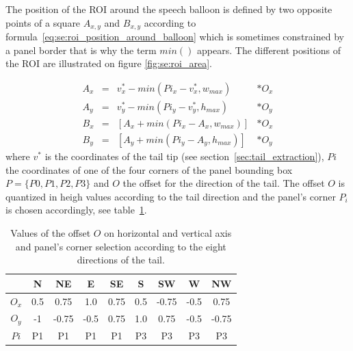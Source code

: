 The position of the ROI around the speech balloon is defined by two opposite points of a square $A_{x,y}$ and $B_{x,y}$ according to formula~\ref{eq:se:roi_position_around_balloon} which is sometimes constrained by a panel border that is why the term $min()$ appears.
The different positions of the ROI are illustrated on figure \ref{fig:se:roi_area}.

\begin{equation}
  \label{eq:se:roi_position_around_balloon}
  \begin{array}{rccl} 
	  A_x & = & v^*_x - min(Pi_x - v^*_x, w_{max}) & * O_x \\ 
	  A_y & = & v^*_y - min(Pi_y - v^*_y, h_{max}) & * O_y \\ 
	  B_x & = & \left[ A_x + min(Pi_x - A_x, w_{max}) \right] & * O_x \\ 
	  B_y & = & \left[ A_y + min(Pi_y - A_y, h_{max}) \right] & * O_y
  \end{array} 
\end{equation}
where $v^*$ is the coordinates of the tail tip (see section~\ref{sec:tail_extraction}), $Pi$ the coordinates of one of the four corners of the panel bounding box $P=\{P0, P1, P2, P3\}$ and $O$ the offset for the direction of the tail.
The offset $O$ is quantized in heigh values according to the tail direction and the panel's corner $P_i$ is chosen accordingly, see table~\ref{tab:se:offset_panel_corner}.

  \begin{table}[ht]
    \normalsize

    \centering
    \caption{Values of the offset $O$ on horizontal and vertical axis and panel's corner selection according to the eight directions of the tail.}
    \setlength{\tabcolsep}{.45em}
    \begin{tabular}{|c|c|c|c|c|c|c|c|c|}

          \hline
	      &  N  & NE  & E  & SE & S & SW & W & NW   \\
	      \hline
	      $O_x$   & 0.5  & 0.75 & 1.0  & 0.75 & 0.5 & -0.75& -0.5 & 0.75  \\
	      \hline
	      $O_y$   & -1   & -0.75& -0.5 & 0.75 & 1.0 & 0.75 & -0.5 & -0.75  \\
	      \hline
	      $Pi$    & P1   & P1   & P1   & P1   & P3  & P3   & P3   & P3   \\
          \hline
        \end{tabular}
    \label{tab:se:offset_panel_corner}
  \end{table}%


